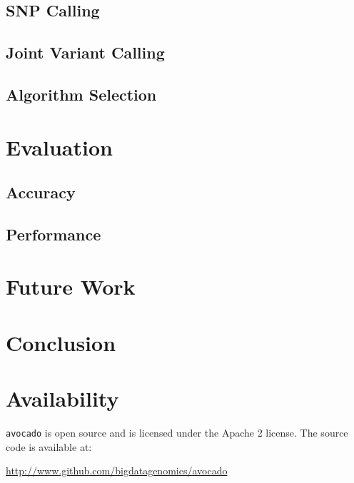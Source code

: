 \documentclass{acm_proc_article-sp}
\begin{document}
\subsection{SNP Calling}
\label{sec:snp-calling}


\subsection{Joint Variant Calling}
\label{sec:joint-variant-calling}


\subsection{Algorithm Selection}
\label{sec:algorithm-selection}


\section{Evaluation}
\label{sec:evaluation}


\subsection{Accuracy}
\label{sec:accuracy}


\subsection{Performance}
\label{sec:performance}


\section{Future Work}
\label{sec:future-work}


\section{Conclusion}
\label{sec:conclusion}

\appendix

\section{Availability}

\texttt{avocado} is open source and is licensed under the Apache 2 license. The source code is available at:

\url{http://www.github.com/bigdatagenomics/avocado}


%

  

\balancecolumns
\end{document}
